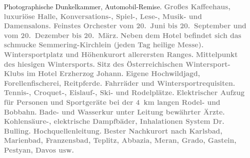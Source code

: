 \begin{ledgroupsized}[t]{13cm}
{{                        Photographische Dunkelkammer, Automobil-Remise.}}\pend
           \pstart
           \noindent{}\centering{}\textcolor{gray}{\textbf{Großes Kaffeehaus, luxuriöse Halle, Konversations-, Spiel-,
                        Lese-, Musik- und Damensalons. Feinstes Orchester vom 20. Juni bis
                        20. September und vom 20. Dezember bis 20. März.}}\pend
           \pstart
           \noindent{}\centering{}\textcolor{gray}{\textbf{Neben dem Hotel befindet sich das schmucke Semmering-Kirchlein (jeden Tag heilige Messe).}}\pend
           \pstart
           \noindent{}\centering{}\textcolor{gray}{\textbf{Wintersportplatz und Höhenkurort allerersten Ranges.}}\pend
           \pstart
           \noindent{}\centering{}\textcolor{gray}{\textbf{Mittelpunkt des hiesigen Wintersports.}}\pend
           \pstart
           \noindent{}\centering{}\textcolor{gray}{\textbf{Sitz des Österreichischen
                            Wintersport-Klubs im Hotel Erzherzog
                            Johann.}}\pend
           \pstart
           \noindent{}\centering{}\textcolor{gray}{\textbf{Eigene Hochwildjagd, Forellenfischerei, Reitpferde.
                        Fahrräder und Wintersportrequisiten.}}\pend
           \pstart
           \noindent{}\centering{}\textcolor{gray}{\textbf{Tennis-, Croquet-, Eislauf-, Ski- und Rodelplätze.}}\pend
           \pstart
           \noindent{}\centering{}\textcolor{gray}{\textbf{Elektrischer Aufzug für Personen und Sportgeräte bei der
                        4 km langen Rodel- und Bobbahn.}}\pend
           \pstart
           \noindent{}\centering{}\textcolor{gray}{\textbf{Bade- und Wasserkur unter Leitung bewährter Ärzte.
                        Kohlensäure-, elektrische Dampfbäder, Inhalationen System Dr. Bulling. Hochquellenleitung.}}\pend
           \pstart
           \noindent{}\centering{}\textcolor{gray}{\textbf{Bester Nachkurort nach Karlsbad, Marienbad, Franzensbad, Teplitz, Abbazia, Meran, Grado, Gastein, Pestyan, Davos usw.
}}
\end{ledgroupsized}
